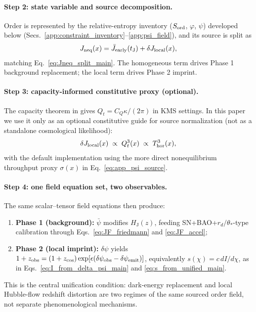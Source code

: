 \documentclass[10pt]{article}
\newcommand{\zobs}{z_{\mathrm{obs}}}
\newcommand{\zcos}{z_{\mathrm{cos}}}
\newcommand{\HJ}{H_{\mathrm{J}}}
\newcommand{\tJ}{t_{\mathrm{J}}}
\begin{document}
\paragraph{Step 2: state variable and source decomposition.}
Order is represented by the relative-entropy inventory (\(S_{\rm ord}\), \(\varphi\), \(\psi\))
developed below (Secs.~\ref{app:constraint_inventory}--\ref{app:psi_field}), and its source is split as
\begin{equation}
J_{\rm neq}(x)=\bar J_{\rm early}(\tJ)+\delta J_{\rm local}(x),
\label{eq:app_tri_Jsplit}
\end{equation}
matching Eq.~\eqref{eq:Jneq_split_main}. The homogeneous term drives Phase 1 background replacement;
the local term drives Phase 2 imprint.

\paragraph{Step 3: capacity-informed constitutive proxy (optional).}
The capacity theorem in \cite{MoonWalk2026EinsteinFromCapacity} gives \(Q_t=C_Q\kappa/(2\pi)\) in KMS settings.
In this paper we use it only as an optional constitutive guide for source normalization (not as a
standalone cosmological likelihood):
\begin{equation}
\delta J_{\rm local}(x)\;\propto\;Q_t^3(x)\;\propto\;T_{\rm hor}^3(x),
\label{eq:app_tri_capacity_proxy}
\end{equation}
with the default implementation using the more direct nonequilibrium throughput proxy \(\sigma(x)\)
in Eq.~\eqref{eq:app_psi_source}.

\paragraph{Step 4: one field equation set, two observables.}
The same scalar--tensor field equations then produce:
\begin{enumerate}[leftmargin=1.2em]
\item \textbf{Phase 1 (background):} \(\bar\psi\) modifies \(\HJ(z)\), feeding SN+BAO+\(r_d/\theta_\ast\)-type
calibration through Eqs.~\eqref{eq:JF_friedmann} and \eqref{eq:JF_accel};
\item \textbf{Phase 2 (local imprint):} \(\delta\psi\) yields
\(1+\zobs=(1+\zcos)\exp[\epsilon(\delta\psi_{\rm obs}-\delta\psi_{\rm emit})]\),
equivalently \(s(\chi)=c\,dI/d\chi\), as in Eqs.~\eqref{eq:I_from_delta_psi_main}
and \eqref{eq:s_from_unified_main}.
\end{enumerate}
This is the central unification condition: dark-energy replacement and local Hubble-flow redshift
distortion are two regimes of the same sourced order field, not separate phenomenological mechanisms.
\end{document}

